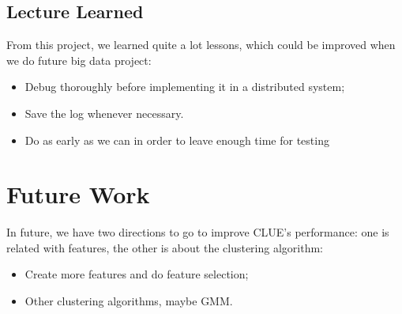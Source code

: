 \subsection{Lecture Learned}
From this project, we learned quite a lot lessons, which could be improved when we do future big data project:
\begin{itemize}
    \item Debug thoroughly before implementing it in a distributed system;
    \item Save the log whenever necessary.
    \item Do as early as we can in order to leave enough time for testing
\end{itemize}

\section{Future Work}
In future, we have two directions to go to improve CLUE's performance: one is related with features, the other is about the clustering algorithm:
\begin{itemize}
    \item Create more features and do feature selection;
    \item Other clustering algorithms, maybe GMM.
\end{itemize}
